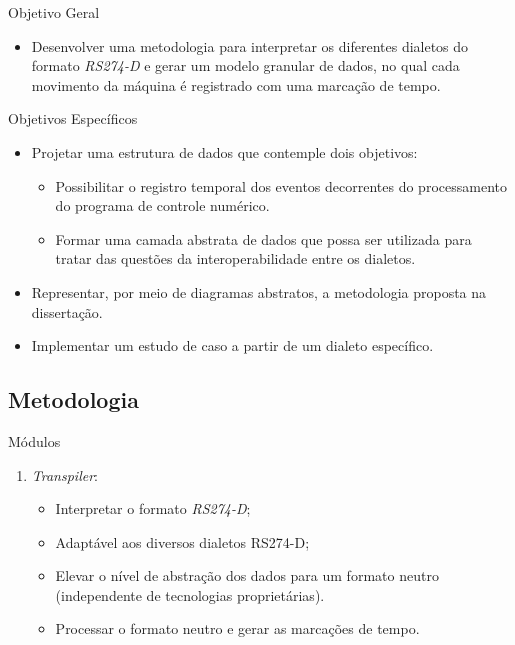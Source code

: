 \documentclass[aspectratio=169]{beamer}
\begin{document}
{\begin{frame}{Objetivo Geral}
  \begin{itemize}
    \item { 
      Desenvolver uma metodologia para interpretar os diferentes dialetos 
      do formato \emph{RS274-D} e gerar um modelo granular de dados, no qual 
      cada movimento da m\'aquina \'e registrado com uma marcação de tempo.
    }
  \end{itemize}
\end{frame}

\begin{frame}{Objetivos Específicos}
  \begin{itemize}
    \item Projetar uma estrutura de dados que contemple dois objetivos:
    \begin{itemize}
        \item Possibilitar o registro temporal dos eventos decorrentes do 
              processamento do programa de controle numérico.
        \item Formar uma camada abstrata de dados que possa ser utilizada
              para tratar das questões da interoperabilidade entre os 
              dialetos.
    \end{itemize}
    \item Representar, por meio de diagramas abstratos, a metodologia proposta na dissertação.
    \item Implementar um estudo de caso a partir de um dialeto específico.
\end{itemize}
\end{frame}


\subsection{Metodologia}

\begin{frame}{Módulos}
  \begin{enumerate}
    \item {
      \emph{Transpiler}: 
      \begin{itemize}
        \item Interpretar o formato \emph{RS274-D};
        \item Adaptável aos diversos dialetos RS274-D;
        \item Elevar o nível de abstração dos dados para um formato 
              neutro (independente de tecnologias proprietárias).
        \item Processar o formato neutro e gerar as marcações de tempo.
      \end{itemize}
    }


\end{enumerate}
\end{frame}}
\end{document}
